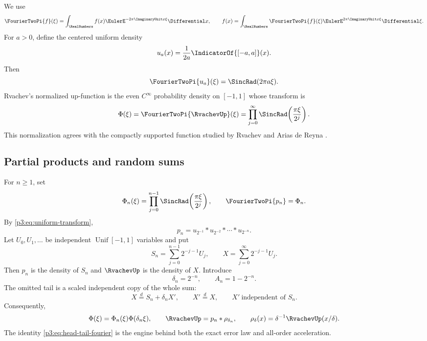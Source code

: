 \documentclass[11pt,oneside]{article}
\numberwithin{equation}{section}
\theoremstyle{definition}
\theoremstyle{remark}
\begin{document}
We use
\begin{equation}
 \FourierTwoPi{f}(\xi)=\int_{\RealNumbers} f(x)\EulerE^{-2\pi\ImaginaryUnit x\xi}\Differential x,
 \qquad
 f(x)=\int_{\RealNumbers}\FourierTwoPi{f}(\xi)\EulerE^{2\pi\ImaginaryUnit x\xi}\Differential\xi.
 \label{p3:eq:fourier-convention}
\end{equation}
For $a>0$, define the centered uniform density
\begin{equation}
 u_a(x)=\frac{1}{2a}\IndicatorOf{[-a,a]}(x).
 \label{p3:eq:uniform-density}
\end{equation}
Then
\begin{equation}
 \FourierTwoPi{u_a}(\xi)=\SincRad(2\pi a\xi).
 \label{p3:eq:uniform-transform}
\end{equation}
Rvachev's normalized up-function is the even $C^\infty$ probability density on
$[-1,1]$ whose transform is
\begin{equation}
 \Phi(\xi)=\FourierTwoPi{\RvachevUp}(\xi)
 =\prod_{j=0}^{\infty}\SincRad\!\left(\frac{\pi\xi}{2^j}\right).
 \label{p3:eq:infinite-product}
\end{equation}
This normalization agrees with the compactly supported function studied by Rvachev
and Arias de Reyna \cite{p3:rvachev1990,p3:arias1982}.

\subsection{Partial products and random sums}

For $n\ge1$, set
\begin{equation}
 \Phi_n(\xi)=\prod_{j=0}^{n-1}\SincRad\!\left(\frac{\pi\xi}{2^j}\right),
 \qquad \FourierTwoPi{p_n}=\Phi_n.
 \label{p3:eq:prefix-product}
\end{equation}
By \cref{p3:eq:uniform-transform},
\begin{equation}
 p_n=u_{2^{-1}}*u_{2^{-2}}*\cdots*u_{2^{-n}}.
 \label{p3:eq:prefix-convolution}
\end{equation}
Let $U_0,U_1,\ldots$ be independent $\operatorname{Unif}[-1,1]$ variables and put
\begin{equation}
 S_n=\sum_{j=0}^{n-1}2^{-j-1}U_j,
 \qquad
 X=\sum_{j=0}^{\infty}2^{-j-1}U_j.
 \label{p3:eq:random-sums}
\end{equation}
Then $p_n$ is the density of $S_n$ and $\RvachevUp$ is the density of $X$.
Introduce
\begin{equation}
 \delta_n=2^{-n},\qquad A_n=1-2^{-n}.
 \label{p3:eq:delta-A}
\end{equation}
The omitted tail is a scaled independent copy of the whole sum:
\begin{equation}
 X\overset d=S_n+\delta_nX',
 \qquad X'\overset d=X,
 \qquad X'\ \text{independent of }S_n.
 \label{p3:eq:head-tail-random}
\end{equation}
Consequently,
\begin{equation}
 \Phi(\xi)=\Phi_n(\xi)\Phi(\delta_n\xi),
 \qquad
 \RvachevUp=p_n*\rho_{\delta_n},
 \qquad
 \rho_\delta(x)=\delta^{-1}\RvachevUp(x/\delta).
 \label{p3:eq:head-tail-fourier}
\end{equation}
The identity \cref{p3:eq:head-tail-fourier} is the engine behind both the exact error law
and all-order acceleration.
\end{document}
